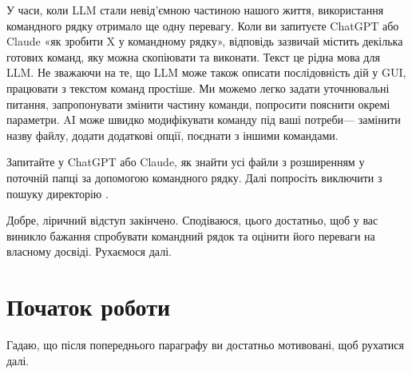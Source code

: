 У часи, коли LLM стали невід'ємною частиною нашого життя,
використання командного рядку отримало ще одну перевагу.
Коли ви запитуєте ChatGPT або Claude «як зробити X у командному рядку»,
відповідь зазвичай містить декілька готових команд, яку можна скопіювати та виконати.
Текст це рідна мова для LLM.
Не зважаючи на те, що LLM може також описати послідовність дій у GUI,
працювати з текстом команд простіше.
Ми можемо легко задати уточнювальні питання,
запропонувати змінити частину команди,
попросити пояснити окремі параметри.
AI може швидко модифікувати команду під ваші потреби---
замінити назву файлу, додати додаткові опції, поєднати з іншими командами.

\begin{exercise}
Запитайте у ChatGPT або Claude, як знайти усі файли з розширенням 
у поточній папці за допомогою командного рядку.
Далі попросіть виключити з пошуку директорію .
\end{exercise}

Добре, ліричний відступ закінчено.
Сподіваюся, цього достатньо, щоб у вас виникло бажання
спробувати командний рядок та оцінити його переваги на власному досвіді.
Рухаємося далі.

\section{Початок роботи}

Гадаю, що після попереднього параграфу ви достатньо мотивовані, щоб рухатися далі.
